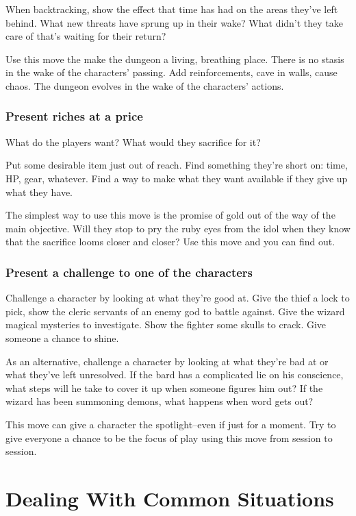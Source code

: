  When backtracking, show the effect that time has had on the areas they've left behind. What new threats have sprung up in their wake? What didn't they take care of that's waiting for their return?


 Use this move the make the dungeon a living, breathing place. There is no stasis in the wake of the characters' passing. Add reinforcements, cave in walls, cause chaos. The dungeon evolves in the wake of the characters' actions.
\subsubsection{Present riches at a price}


 What do the players want? What would they sacrifice for it?


 Put some desirable item just out of reach. Find something they're short on: time, HP, gear, whatever. Find a way to make what they want available if they give up what they have.


 The simplest way to use this move is the promise of gold out of the way of the main objective. Will they stop to pry the ruby eyes from the idol when they know that the sacrifice looms closer and closer? Use this move and you can find out.
\subsubsection{Present a challenge to one of the characters}


 Challenge a character by looking at what they're good at. Give the thief a lock to pick, show the cleric servants of an enemy god to battle against. Give the wizard magical mysteries to investigate. Show the fighter some skulls to crack. Give someone a chance to shine.


 As an alternative, challenge a character by looking at what they're bad at or what they've left unresolved. If the bard has a complicated lie on his conscience, what steps will he take to cover it up when someone figures him out? If the wizard has been summoning demons, what happens when word gets out?


 This move can give a character the spotlight--even if just for a moment. Try to give everyone a chance to be the focus of play using this move from session to session.
\section*{Dealing With Common Situations}


